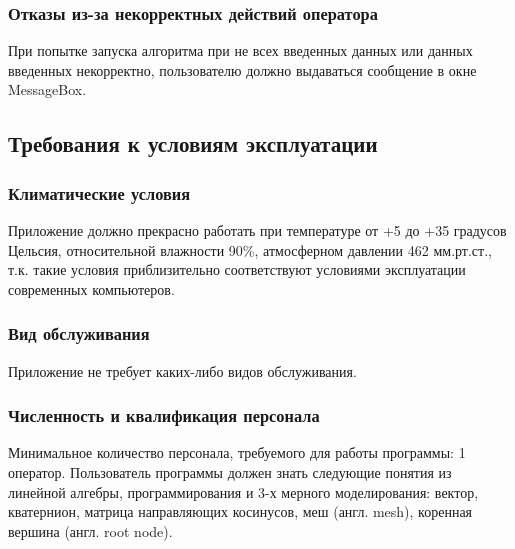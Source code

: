 \subsubsection{Отказы из-за некорректных действий оператора}
При попытке запуска алгоритма при не всех введенных данных или данных введенных некорректно, пользователю должно выдаваться сообщение в окне MessageBox.


\subsection{Требования к условиям эксплуатации}
\subsubsection{Климатические условия}
Приложение должно прекрасно работать при температуре от +5 до +35 градусов Цельсия, относительной влажности 90\%, атмосферном давлении 462 мм.рт.ст., т.к. такие условия приблизительно соответствуют условиями эксплуатации современных компьютеров.
\subsubsection{Вид обслуживания}
Приложение не требует каких-либо видов обслуживания.
\subsubsection{Численность и квалификация персонала}
Минимальное количество персонала, требуемого для работы программы: 1 оператор. Пользователь программы должен знать следующие понятия из линейной алгебры, программирования и 3-х мерного моделирования: вектор, кватернион, матрица направляющих косинусов, меш (англ. mesh), коренная вершина (англ. root node).

